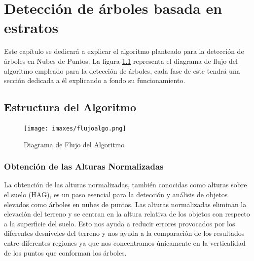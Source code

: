 \chapter{Detección de árboles basada en estratos}
\label{chap:Deteccion}
Este capítulo se dedicará a explicar el algoritmo planteado para la detección de árboles en Nubes de Puntos. La figura \ref{fig:diagFlujoAlgoritmo} representa el diagrama de flujo del algoritmo empleado para la detección de árboles, cada fase de este tendrá una sección dedicada a él explicando a fondo su funcionamiento.

\section{Estructura del Algoritmo}
\label{sec:EstrucuturaProp}

\begin{figure}[h]
\centering
\texttt{[image: imaxes/flujoalgo.png]}
\caption{Diagrama de Flujo del Algoritmo}
\label{fig:diagFlujoAlgoritmo}
\end{figure}


\subsection{Obtención de las Alturas Normalizadas}
\label{chap:normalAlgo}

La obtención de las alturas normalizadas, también conocidas como alturas sobre el suelo (HAG), es un paso esencial para la detección y análisis de objetos elevados como árboles en nubes de puntos. Las alturas normalizadas eliminan la elevación del terreno y se centran en la altura relativa de los objetos con respecto a la superficie del suelo.
Esto nos ayuda a reducir errores provocados por los diferentes desniveles del terreno y nos ayuda a la comparación de los resultados entre diferentes regiones ya que nos concentramos únicamente en la verticalidad de los puntos que conforman los árboles.

